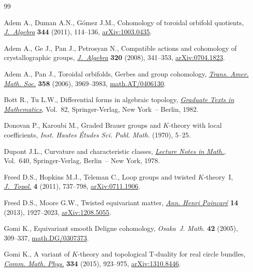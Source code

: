 \documentclass[pdftex]{sigma}
\theoremstyle{definition}
\begin{document}
\begin{thebibliography}{99}
\footnotesize\itemsep=0pt

Adem A., Duman A.N., G\'omez J.M., Cohomology of toroidal orbifold quotients,
 \href{https://doi.org/10.1016/j.jalgebra.2011.08.004}{\textit{J.~Algebra}} \textbf{344} (2011), 114--136, \href{http://arxiv.org/abs/1003.0435}{arXiv:1003.0435}.

Adem A., Ge J., Pan J., Petrosyan N., Compatible actions and cohomology of
 crystallographic groups, \href{https://doi.org/10.1016/j.jalgebra.2008.02.012}{\textit{J.~Algebra}} \textbf{320} (2008), 341--353,
 \href{http://arxiv.org/abs/0704.1823}{arXiv:0704.1823}.

Adem A., Pan J., Toroidal orbifolds, {G}erbes and group cohomology,
 \href{https://doi.org/10.1090/S0002-9947-06-04017-7}{\textit{Trans. Amer. Math. Soc.}} \textbf{358} (2006), 3969--3983,
 \href{http://arxiv.org/abs/math.AT/0406130}{math.AT/0406130}.

Bott R., Tu L.W., Dif\/ferential forms in algebraic topology, \href{https://doi.org/10.1007/978-1-4757-3951-0}{\textit{Graduate
 Texts in Mathematics}}, Vol.~82, Springer-Verlag, New York~-- Berlin, 1982.

Donovan P., Karoubi M., Graded {B}rauer groups and {$K$}-theory with local
 coef\/f\/icients, \textit{Inst. Hautes \'Etudes Sci. Publ. Math.} (1970), 5--25.

Dupont J.L., Curvature and characteristic classes, \href{https://doi.org/10.1007/BFb0065364}{\textit{Lecture Notes in
 Math.}}, Vol.~640, Springer-Verlag, Berlin~-- New York, 1978.

Freed D.S., Hopkins M.J., Teleman C., Loop groups and twisted {$K$}-theory~{I},
 \href{https://doi.org/10.1112/jtopol/jtr019}{\textit{J.~Topol.}} \textbf{4} (2011), 737--798, \href{http://arxiv.org/abs/0711.1906}{arXiv:0711.1906}.

Freed D.S., Moore G.W., Twisted equivariant matter, \href{https://doi.org/10.1007/s00023-013-0236-x}{\textit{Ann. Henri
 Poincar\'e}} \textbf{14} (2013), 1927--2023, \href{http://arxiv.org/abs/1208.5055}{arXiv:1208.5055}.

Gomi K., Equivariant smooth {D}eligne cohomology, \textit{Osaka~J. Math.}
 \textbf{42} (2005), 309--337, \href{http://arxiv.org/abs/math.DG/0307373}{math.DG/0307373}.

Gomi K., A variant of {$K$}-theory and topological {T}-duality for real circle
 bundles, \href{https://doi.org/10.1007/s00220-014-2153-3}{\textit{Comm. Math. Phys.}} \textbf{334} (2015), 923--975,
 \href{http://arxiv.org/abs/1310.8446}{arXiv:1310.8446}.


\end{thebibliography}
\end{document}
